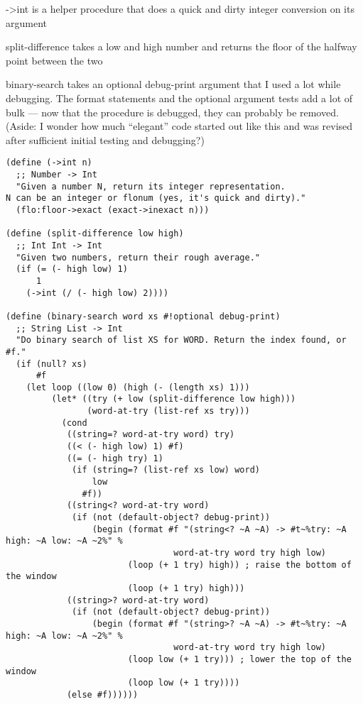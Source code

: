 \documentclass[12pt,openright,draft]{book}
\begin{document}
->int is a helper procedure that does a quick and dirty integer
conversion on its argument

split-difference takes a low and high number and returns the floor of
the halfway point between the two

binary-search takes an optional debug-print argument that I used a lot
while debugging. The format statements and the optional argument tests
add a lot of bulk --- now that the procedure is debugged, they can
probably be removed. (Aside: I wonder how much ``elegant'' code
started out like this and was revised after sufficient initial testing
and debugging?)

\begin{verbatim}
(define (->int n)
  ;; Number -> Int
  "Given a number N, return its integer representation.
N can be an integer or flonum (yes, it's quick and dirty)."
  (flo:floor->exact (exact->inexact n)))

(define (split-difference low high)
  ;; Int Int -> Int
  "Given two numbers, return their rough average."
  (if (= (- high low) 1)
      1
    (->int (/ (- high low) 2))))

(define (binary-search word xs #!optional debug-print)
  ;; String List -> Int
  "Do binary search of list XS for WORD. Return the index found, or #f."
  (if (null? xs)
      #f
    (let loop ((low 0) (high (- (length xs) 1)))
         (let* ((try (+ low (split-difference low high)))
                (word-at-try (list-ref xs try)))
           (cond
            ((string=? word-at-try word) try)
            ((< (- high low) 1) #f)
            ((= (- high try) 1) 
             (if (string=? (list-ref xs low) word)
                 low
               #f))
            ((string<? word-at-try word)
             (if (not (default-object? debug-print))
                 (begin (format #f "(string<? ~A ~A) -> #t~%try: ~A high: ~A low: ~A ~2%" %
                                 word-at-try word try high low)
                        (loop (+ 1 try) high)) ; raise the bottom of the window
                        (loop (+ 1 try) high)))
            ((string>? word-at-try word)
             (if (not (default-object? debug-print))
                 (begin (format #f "(string>? ~A ~A) -> #t~%try: ~A high: ~A low: ~A ~2%" %
                                 word-at-try word try high low)
                        (loop low (+ 1 try))) ; lower the top of the window
                        (loop low (+ 1 try))))
            (else #f))))))
\end{verbatim}
\end{document}
